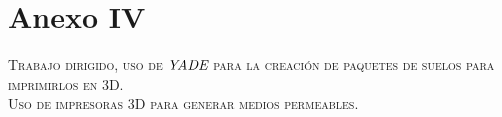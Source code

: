 \chapter*{Anexo IV}

\begin{center}
\large\scshape Trabajo dirigido, uso de $\textit{YADE}$ para la creaci\'on de paquetes de suelos para imprimirlos en 3D.\\
\vspace{2 cm}
Uso de impresoras 3D para generar medios permeables.
\end{center}

%



